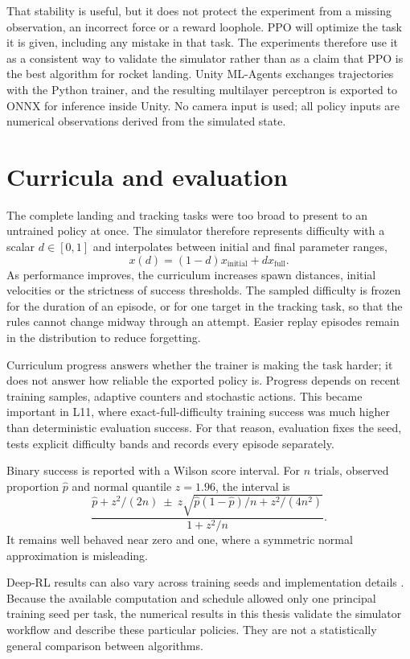 That stability is useful, but it does not protect the experiment from a missing observation, an
incorrect force or a reward loophole. PPO will optimize the task it is given, including any
mistake in that task. The experiments therefore use it as a consistent way to validate the
simulator rather than as a claim that PPO is the best algorithm for rocket landing. Unity
ML-Agents exchanges trajectories with the Python trainer, and the resulting multilayer
perceptron is exported to ONNX for inference inside Unity. No camera input is used; all policy
inputs are numerical observations derived from the simulated state.

\section{Curricula and evaluation}

The complete landing and tracking tasks were too broad to present to an untrained policy at
once. The simulator therefore represents difficulty with a scalar $d\in[0,1]$ and interpolates
between initial and final parameter ranges,
\begin{equation}
  x(d)=(1-d)x_{\mathrm{initial}}+d x_{\mathrm{full}}.
  \label{eq:curriculum-interpolation}
\end{equation}
As performance improves, the curriculum increases spawn distances, initial velocities or the
strictness of success thresholds. The sampled difficulty is frozen for the duration of an
episode, or for one target in the tracking task, so that the rules cannot change midway through
an attempt. Easier replay episodes remain in the distribution to reduce forgetting.

Curriculum progress answers whether the trainer is making the task harder; it does not answer
how reliable the exported policy is. Progress depends on recent training samples, adaptive
counters and stochastic actions. This became important in L11, where exact-full-difficulty
training success was much higher than deterministic evaluation success. For that reason,
evaluation fixes the seed, tests explicit difficulty bands and records every episode separately.

Binary success is reported with a Wilson score interval. For $n$ trials, observed proportion
$\hat p$ and normal quantile $z=1.96$, the interval is
\begin{equation}
\frac{\hat p+z^2/(2n)\ \pm\ z\sqrt{\hat p(1-\hat p)/n+z^2/(4n^2)}}
     {1+z^2/n}.
\label{eq:wilson}
\end{equation}
It remains well behaved near zero and one, where a symmetric normal approximation is misleading.

Deep-RL results can also vary across training seeds and implementation details
\cite{henderson2018matters,agarwal2021precipice}. Because the available computation and schedule
allowed only one principal training seed per task, the numerical results in this thesis validate
the simulator workflow and describe these particular policies. They are not a statistically
general comparison between algorithms.
